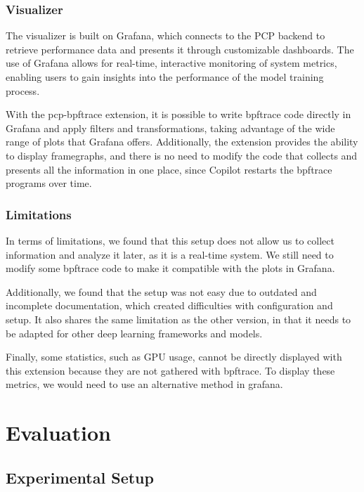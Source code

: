 \documentclass[conference]{IEEEtran}
\begin{document}
\subsubsection{Visualizer}

The visualizer is built on Grafana, which connects to the PCP backend to retrieve performance data and presents it through customizable dashboards.
The use of Grafana allows for real-time, interactive monitoring of system metrics, enabling users to gain insights into the performance of the model training process.

With the pcp-bpftrace extension, it is possible to write bpftrace code directly in Grafana and apply filters and transformations, taking advantage of the wide range of plots that Grafana offers.
Additionally, the extension provides the ability to display framegraphs, and there is no need to modify the code that collects and presents all the information in one place, since Copilot restarts the bpftrace programs over time.

\subsubsection{Limitations}

In terms of limitations, we found that this setup does not allow us to collect information and analyze it later, as it is a real-time system.
We still need to modify some bpftrace code to make it compatible with the plots in Grafana.

Additionally, we found that the setup was not easy due to outdated and incomplete documentation, which created difficulties with configuration and setup.
It also shares the same limitation as the other version, in that it needs to be adapted for other deep learning frameworks and models.

Finally, some statistics, such as GPU usage, cannot be directly displayed with this extension because they are not gathered with bpftrace. To display these metrics, we would need to use an alternative method in grafana.

\section{Evaluation}

\subsection{Experimental Setup}
\end{document}
